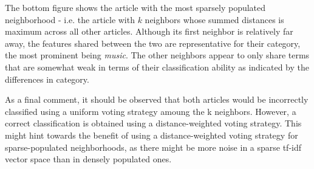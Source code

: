 \documentclass[11pt]{article}
\begin{document}
The bottom figure shows the article with the most sparsely populated neighborhood - i.e. the article with $k$ neighbors whose summed distances is maximum across all other articles.
Although its first neighbor is relatively far away, the features shared between the two are representative for their category, the most prominent being \emph{music}.
The other neighbors appear to only share terms that are somewhat weak in terms of their classification ability as indicated by the differences in category.

As a final comment, it should be observed that both articles would be incorrectly classified using a uniform voting strategy amoung the k neighbors.
However, a correct classification is obtained using a distance-weighted voting strategy.
This might hint towards the benefit of using a distance-weighted voting strategy for sparse-populated neighborhoods, as there might be more noise in a sparse tf-idf vector space than in densely populated ones.

{}

\end{document}
